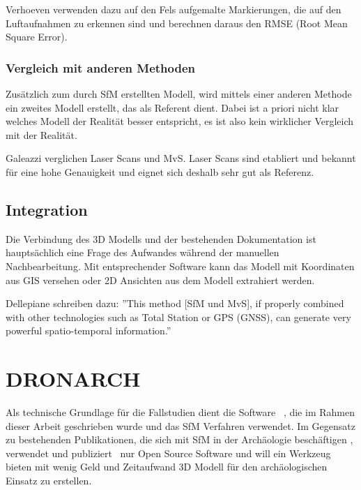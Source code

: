 				Verhoeven \etal {} verwenden dazu auf den Fels aufgemalte Markierungen, die auf den Luftaufnahmen zu erkennen sind und berechnen daraus den RMSE (Root Mean Square Error).

			\subsubsection{Vergleich mit anderen Methoden}
				Zusätzlich zum durch SfM erstellten Modell, wird mittels einer anderen Methode ein zweites Modell erstellt, das als Referent dient. Dabei ist a priori nicht klar welches Modell der Realität besser entspricht, es ist also kein wirklicher Vergleich mit der Realität.
				
				Galeazzi \etal {} verglichen Laser Scans und MvS. Laser Scans sind etabliert und bekannt für eine hohe Genauigkeit und eignet sich deshalb sehr gut als Referenz.
			
		\subsection{Integration}
			Die Verbindung des 3D Modells und der bestehenden Dokumentation ist hauptsächlich eine Frage des Aufwandes während der manuellen Nachbearbeitung. Mit entsprechender Software kann das Modell mit Koordinaten aus GIS versehen oder 2D Ansichten aus dem Modell extrahiert werden.
			
			Dellepiane \etal schreiben dazu: ''This method [SfM und MvS], if properly combined with other technologies such as Total Station or GPS (GNSS), can generate very powerful spatio-temporal information.'' 
		
	\section{DRONARCH}
		Als technische Grundlage für die Fallstudien dient die Software \dronarch\ , die im Rahmen dieser Arbeit geschrieben wurde und das SfM Verfahren verwendet.
		Im Gegensatz zu bestehenden Publikationen, die sich mit SfM in der Archäologie beschäftigen , verwendet und publiziert \dronarch\ nur Open Source Software und will ein Werkzeug bieten mit wenig Geld und Zeitaufwand 3D Modell für den archäologischen Einsatz zu erstellen.

	